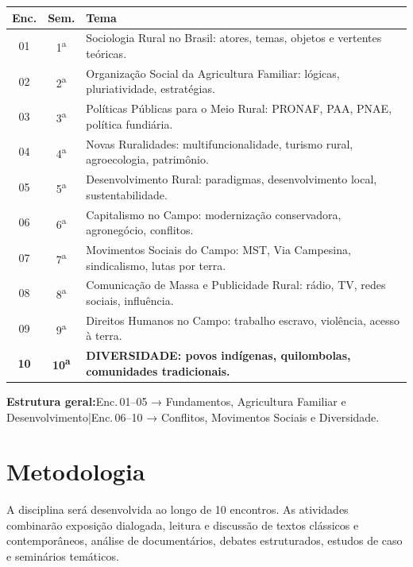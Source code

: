 \documentclass[11pt,a4paper]{article}
\begin{document}
\begin{small}
\renewcommand{\arraystretch}{1.35}
\begin{tabularx}{\textwidth}{@{}c c X@{}}
\toprule
\textbf{Enc.} & \textbf{Sem.} & \textbf{Tema} \\
\midrule
01 & 1\textsuperscript{a} & Sociologia Rural no Brasil: atores, temas, objetos e vertentes teóricas. \\
02 & 2\textsuperscript{a} & Organização Social da Agricultura Familiar: lógicas, pluriatividade, estratégias. \\
03 & 3\textsuperscript{a} & Políticas Públicas para o Meio Rural: PRONAF, PAA, PNAE, política fundiária. \\
04 & 4\textsuperscript{a} & Novas Ruralidades: multifuncionalidade, turismo rural, agroecologia, patrimônio. \\
05 & 5\textsuperscript{a} & Desenvolvimento Rural: paradigmas, desenvolvimento local, sustentabilidade. \\
06 & 6\textsuperscript{a} & Capitalismo no Campo: modernização conservadora, agronegócio, conflitos. \\
07 & 7\textsuperscript{a} & Movimentos Sociais do Campo: MST, Via Campesina, sindicalismo, lutas por terra. \\
08 & 8\textsuperscript{a} & Comunicação de Massa e Publicidade Rural: rádio, TV, redes sociais, influência. \\
09 & 9\textsuperscript{a} & Direitos Humanos no Campo: trabalho escravo, violência, acesso à terra. \\
\rowcolor{uefslight!70!white}
\textbf{10} & \textbf{10\textsuperscript{a}} & \textbf{\textsf{DIVERSIDADE}: povos indígenas, quilombolas, comunidades tradicionais.} \\
\bottomrule
\end{tabularx}
\end{small}

\begin{tcolorbox}[uefsbox]
\textbf{Estrutura geral:}\enspace Enc.\,01--05 → Fundamentos, Agricultura Familiar e Desenvolvimento\enspace|\enspace Enc.\,06--10 → Conflitos, Movimentos Sociais e Diversidade.
\end{tcolorbox}


\section*{Metodologia}

A disciplina será desenvolvida ao longo de 10 encontros. As atividades combinarão exposição dialogada, leitura e discussão de textos clássicos e contemporâneos, análise de documentários, debates estruturados, estudos de caso e seminários temáticos.
\end{document}
